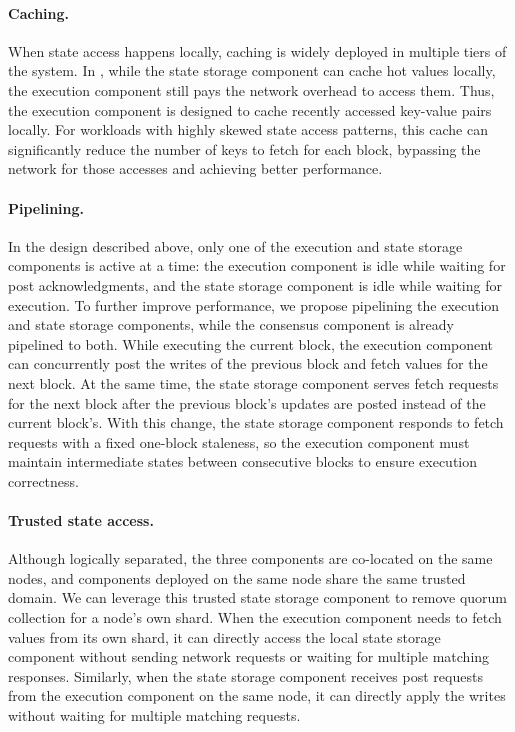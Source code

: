 
\paragraph{Caching.}
When state access happens locally, caching is widely deployed in multiple tiers of the system.
In \sys, while the state storage component can cache hot values locally, the execution component still pays the network overhead to access them.
Thus, the execution component is designed to cache recently accessed key-value pairs locally.
For workloads with highly skewed state access patterns, this cache can significantly reduce the number of keys to fetch for each block, bypassing the network for those accesses and achieving better performance.

\paragraph{Pipelining.}
In the design described above, only one of the execution and state storage components is active at a time: the execution component is idle while waiting for post acknowledgments, and the state storage component is idle while waiting for execution.
To further improve performance, we propose pipelining the execution and state storage components, while the consensus component is already pipelined to both.
While executing the current block, the execution component can concurrently post the writes of the previous block and fetch values for the next block.
At the same time, the state storage component serves fetch requests for the next block after the previous block's updates are posted instead of the current block's.
With this change, the state storage component responds to fetch requests with a fixed one-block staleness, so the execution component must maintain intermediate states between consecutive blocks to ensure execution correctness.

\paragraph{Trusted state access.}
Although logically separated, the three components are co-located on the same nodes, and components deployed on the same node share the same trusted domain.
We can leverage this trusted state storage component to remove quorum collection for a node's own shard.
When the execution component needs to fetch values from its own shard, it can directly access the local state storage component without sending network requests or waiting for multiple matching responses.
Similarly, when the state storage component receives post requests from the execution component on the same node, it can directly apply the writes without waiting for multiple matching requests.